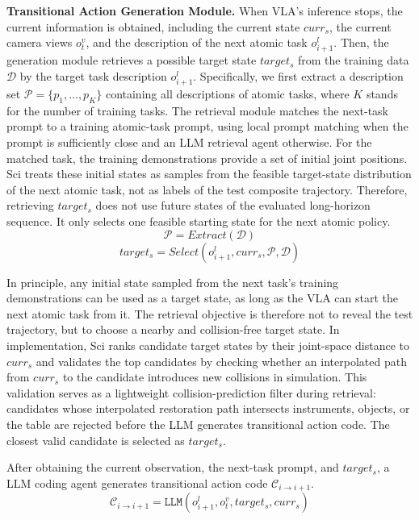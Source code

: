 \documentclass[letterpaper]{article} %
\begin{document}
\textbf{Transitional Action Generation Module.}
When VLA's inference stops, the current information is obtained, including the current state $curr_s$, the current camera views $o^v_t$, and the description of the next atomic task $o^l_{i+1}$. Then, the generation module retrieves a possible target state $target_s$ from the training data $\mathcal{D}$ by the target task description $o_{i+1}^l$.
Specifically, we first extract a description set $\mathcal{P}=\{p_1, \dots, p_K\}$ containing all descriptions of atomic tasks, where $K$ stands for the number of training tasks. The retrieval module matches the next-task prompt to a training atomic-task prompt, using local prompt matching when the prompt is sufficiently close and an LLM retrieval agent otherwise. For the matched task, the training demonstrations provide a set of initial joint positions. Sci treats these initial states as samples from the feasible target-state distribution of the next atomic task, not as labels of the test composite trajectory. Therefore, retrieving $target_s$ does not use future states of the evaluated long-horizon sequence. It only selects one feasible starting state for the next atomic policy.
\begin{equation}
    \mathcal{P} = Extract(\mathcal{D})
\end{equation}
\begin{equation}
    target_s = Select(o^l_{i+1}, curr_s, \mathcal{P}, \mathcal{D})
\end{equation}

In principle, any initial state sampled from the next task's training demonstrations can be used as a target state, as long as the VLA can start the next atomic task from it. The retrieval objective is therefore not to reveal the test trajectory, but to choose a nearby and collision-free target state. In implementation, Sci ranks candidate target states by their joint-space distance to $curr_s$ and validates the top candidates by checking whether an interpolated path from $curr_s$ to the candidate introduces new collisions in simulation. This validation serves as a lightweight collision-prediction filter during retrieval: candidates whose interpolated restoration path intersects instruments, objects, or the table are rejected before the LLM generates transitional action code. The closest valid candidate is selected as $target_s$.

After obtaining the current observation, the next-task prompt, and $target_s$, a LLM coding agent generates transitional action code $\mathcal{C}_{i \rightarrow i+1}$.
\begin{equation}
    \mathcal{C}_{i \rightarrow i+1} = \texttt{LLM}(o^l_{i+1},o^v_t,target_s,curr_s)
\end{equation}
\end{document}
